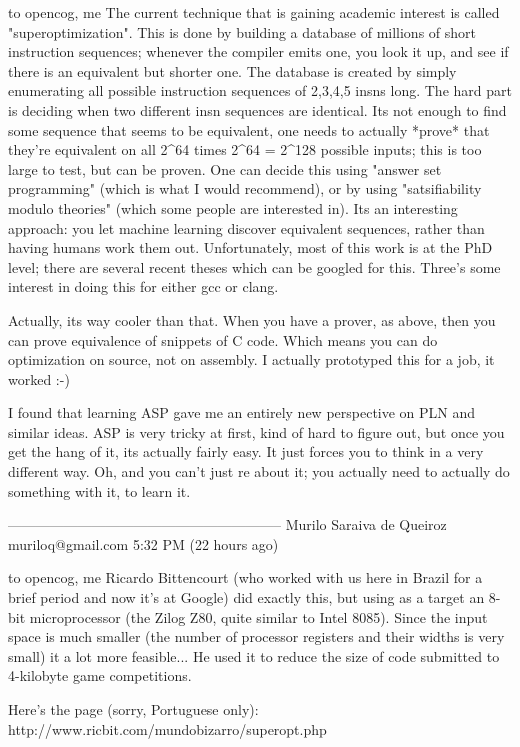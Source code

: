 \documentclass[11pt]{article}
\begin{document}
to opencog, me
The current technique that is gaining academic interest is called "superoptimization".    This is done by building a database of millions of short instruction sequences; whenever the compiler emits one, you look it up, and see if there is an equivalent but shorter one.  The database is created by simply enumerating all possible instruction sequences of 2,3,4,5 insns long.  The hard part is deciding when two different insn sequences are identical.  Its not enough to find some sequence that seems to be equivalent, one needs to actually *prove* that they're equivalent on all 2^64 times 2^64 = 2^128 possible inputs; this is too large to test, but can be proven.   One can decide this using "answer set programming" (which is what I would recommend), or by using "satsifiability modulo theories" (which some people are interested in).   Its an interesting approach: you let machine learning discover equivalent sequences, rather than having humans work them out.  Unfortunately, most of this work is at the PhD level; there are several recent theses which can be googled for this.   Three's some interest in doing this for either gcc or clang.

Actually, its way cooler than that. When you have a prover, as above, then you can prove equivalence of snippets of C code.  Which means you can do optimization on source, not on assembly.  I actually prototyped this for a job, it worked :-)

I found that learning ASP gave me an entirely new perspective on PLN and similar ideas.   ASP is very tricky at first, kind of hard to figure out, but once you get the hang of it, its actually fairly easy.  It just forces you to think in a very different way.  Oh, and you can't just re about it; you actually need to actually do something with it, to learn it.

-----------------------------------------------------------
Murilo Saraiva de Queiroz muriloq@gmail.com
5:32 PM (22 hours ago)

to opencog, me 
Ricardo Bittencourt (who worked with us here in Brazil for a brief period and now it's at Google) did exactly this, but using as a target an 8-bit microprocessor (the Zilog Z80, quite similar to Intel 8085). Since the input space is much smaller (the number of processor registers and their widths is very small) it a lot more feasible... He used it to reduce the size of code submitted to 4-kilobyte game competitions. 

Here's the page (sorry, Portuguese only):  http://www.ricbit.com/mundobizarro/superopt.php  
\end{document}
